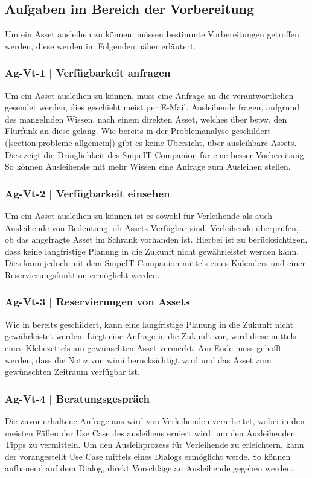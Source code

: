 
\subsection{Aufgaben im Bereich der Vorbereitung}
Um ein Asset ausleihen zu können, müssen bestimmte Vorbereitungen getroffen werden, diese werden im
Folgenden näher erläutert.
\subsubsection{Ag-Vt-1 | Verfügbarkeit anfragen}
\label{subsubsection:Ag-Vt-1}
Um ein Asset ausleihen zu können, muss eine Anfrage an die verantwortlichen gesendet werden, dies
geschieht meist per E-Mail. Ausleihende fragen, aufgrund des mangelnden Wissen, nach einem direkten
Asset, welches über bspw. den Flurfunk an diese gelang. Wie bereits in der Problemanalyse geschildert
(\ref{section:probleme-allgemein}) gibt es keine Übersicht, über ausleihbare Assets. Dies zeigt die
Dringlichkeit des SnipeIT Companion für eine besser Vorbereitung. So können Ausleihende mit mehr
Wissen eine Anfrage zum Ausleihen stellen. 
\subsubsection{Ag-Vt-2 | Verfügbarkeit einsehen}
\label{subsubsection:Ag-Vt-2}
Um ein Asset ausleihen zu können ist es sowohl für Verleihende als auch Ausleihende von Bedeutung,
ob Assets Verfügbar sind. Verleihende überprüfen, ob das angefragte Asset im Schrank vorhanden ist.
Hierbei ist zu berücksichtigen, dass keine langfristige Planung in die Zukunft nicht gewährleistet
werden kann. Dies kann jedoch mit dem SnipeIT Companion mittels eines Kalenders und einer
Reservierungsfunktion ermöglicht werden.
\subsubsection{Ag-Vt-3 | Reservierungen von Assets}
\label{subsubsection:Ag-Vt-3}
Wie in  bereits geschildert, kann eine langfristige Planung in die
Zukunft nicht gewährleistet werden. Liegt eine Anfrage in die Zukunft vor, wird diese mittels eines
Klebezettels am gewünschten Asset vermerkt. Am Ende muss gehofft werden, dass die Notiz von
\ac{wimi} berücksichtigt wird und das Asset zum gewünschten Zeitraum verfügbar ist.
\subsubsection{Ag-Vt-4 | Beratungsgespräch }
\label{subsubsection:Ag-Vt-4}
Die zuvor erhaltene Anfrage aus  wird von Verleihenden verarbeitet,
wobei in den meisten Fällen der Use Case des ausleihens eruiert wird, um den Ausleihenden Tipps zu
vermitteln. Um den Ausleihprozess für Verleihende zu erleichtern, kann der vorangestellt Use Case
mittels eines Dialogs ermöglicht werde. So können aufbauend auf dem Dialog, direkt Vorschläge an
Ausleihende gegeben werden.


